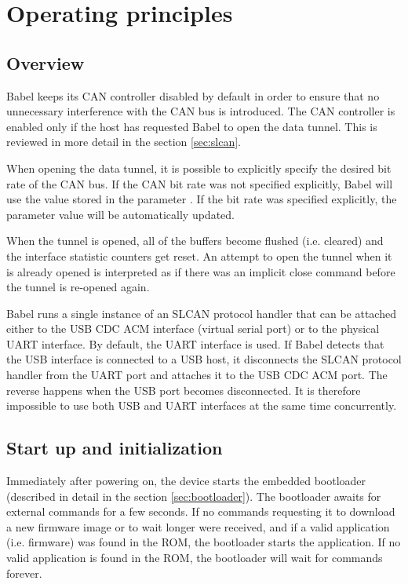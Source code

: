 \documentclass{zubaxdoc}
\begin{document}
\chapter{Operating principles}

\section{Overview}

Babel keeps its CAN controller disabled by default in order to ensure that no unnecessary
interference with the CAN bus is introduced.
The CAN controller is enabled only if the host has requested Babel to open the data tunnel.
This is reviewed in more detail in the section \ref{sec:slcan}.

When opening the data tunnel, it is possible to explicitly specify the desired bit rate of the CAN bus.
If the CAN bit rate was not specified explicitly, Babel will use the value stored in the parameter
.
If the bit rate was specified explicitly, the parameter value will be automatically updated.

When the tunnel is opened, all of the buffers become flushed (i.e. cleared)
and the interface statistic counters get reset.
An attempt to open the tunnel when it is already opened is interpreted as if there was an implicit
close command before the tunnel is re-opened again.

Babel runs a single instance of an SLCAN protocol handler that can be attached either to the
USB CDC ACM interface (virtual serial port) or to the physical UART interface.
By default, the UART interface is used.
If Babel detects that the USB interface is connected to a USB host,
it disconnects the SLCAN protocol handler from the UART port and attaches it to the USB CDC ACM port.
The reverse happens when the USB port becomes disconnected.
It is therefore impossible to use both USB and UART interfaces at the same time concurrently.

\section{Start up and initialization}

Immediately after powering on, the device starts the embedded bootloader (described in detail in the section
\ref{sec:bootloader}).
The bootloader awaits for external commands for a few seconds.
If no commands requesting it to download a new firmware image or to wait longer were received,
and if a valid application (i.e. firmware) was found in the ROM,
the bootloader starts the application.
If no valid application is found in the ROM, the bootloader will wait for commands forever.
\end{document}
